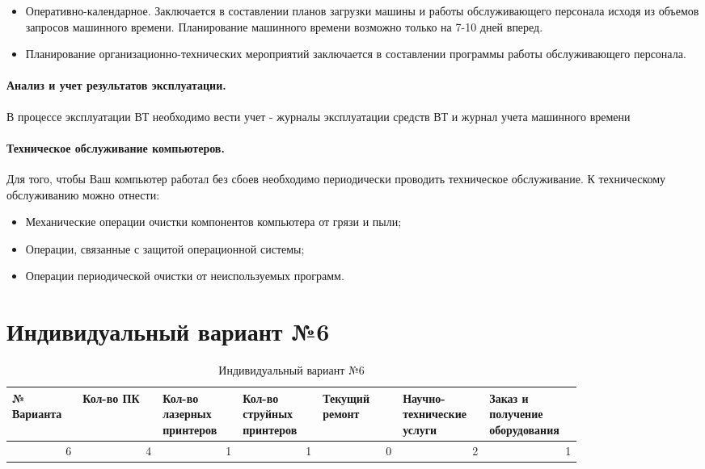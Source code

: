 \documentclass[a4paper,14pt]{extarticle}
\begin{document}
\begin{itemize}
\item Оперативно-календарное. Заключается в составлении планов загрузки машины и работы обслуживающего персонала исходя из объемов запросов машинного времени. Планирование машинного времени возможно только на 7-10 дней вперед.

\item Планирование организационно-технических мероприятий заключается в составлении программы работы обслуживающего персонала.

\end{itemize}

\paragraph{Анализ и учет результатов эксплуатации.} В процессе эксплуатации ВТ необходимо вести учет - журналы эксплуатации средств ВТ и журнал учета машинного времени

\paragraph{Техническое обслуживание компьютеров.} Для того, чтобы Ваш компьютер работал без сбоев необходимо периодически проводить техническое обслуживание. К техническому обслуживанию можно отнести:

\begin{itemize}
\item Механические операции очистки компонентов компьютера от грязи и пыли;

\item Операции, связанные с защитой операционной системы;

\item Операции периодической очистки от неиспользуемых программ.
\end{itemize}


\section{Индивидуальный вариант №6}

\begin{table}[htbp]
	
	\small
	\begin{tabular}{|p{0.1\linewidth}|p{0.12\linewidth}|p{0.12\linewidth}|p{0.12\linewidth}|p{0.12\linewidth}|p{0.12\linewidth}|p{0.12\linewidth}|}
		\hline
		№
		Варианта & Кол-во
		ПК & Кол-во
		лазерных
		принтеров & Кол-во
		струйных
		принтеров & Текущий ремонт & Научно-технические услуги & Заказ и получение оборудования \\ \hline
		\multicolumn{1}{|r|}{6} & \multicolumn{1}{r|}{4} & \multicolumn{1}{r|}{1} & \multicolumn{1}{r|}{1} & \multicolumn{1}{r|}{0} & \multicolumn{1}{r|}{2} & \multicolumn{1}{r|}{1} \\ \hline
	\end{tabular}
    \caption{Индивидуальный вариант №6}
	\label{}
\end{table}
\newpage
\end{document}
